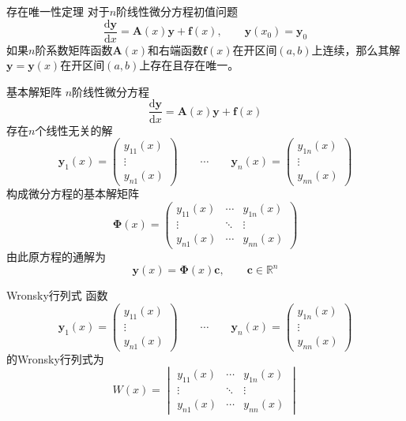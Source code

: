 \documentclass[lang = cn, scheme = chinese, thmcnt = section]{elegantbook}
\newcommand{\R}{\mathbb{R}}            %
\newcommand{\bs}{\boldsymbol}          %
\begin{document}
\begin{theorem}{存在唯一性定理}
	对于$n$阶线性微分方程初值问题
	$$
	\frac{\mathrm{d}\bs{y}}{\mathrm{d}x}=\bs{A}(x)\bs{y}+\bs{f}(x),\qquad 
	\bs{y}(x_0)=\bs{y}_0
	$$
	如果$n$阶系数矩阵函数$\bs{A}(x)$和右端函数$\bs{f}(x)$在开区间$(a,b)$上连续，那么其解$\bs{y}=\bs{y}(x)$在开区间$(a,b)$上存在且存在唯一。
\end{theorem}

\begin{definition}{基本解矩阵}
	$n$阶线性微分方程
	$$
	\frac{\mathrm{d}\bs{y}}{\mathrm{d}x}=\bs{A}(x)\bs{y}+\bs{f}(x)
	$$
	存在$n$个线性无关的解%
	$$
	\bs{y}_1(x)=\left(\begin{matrix}y_{11}(x)\\\vdots\\y_{n1}(x)\end{matrix}\right)\qquad 
	\cdots\qquad 
	\bs{y}_n(x)=\left(\begin{matrix}y_{1n}(x)\\\vdots\\y_{nn}(x)\end{matrix}\right)
	$$
	构成微分方程的基本解矩阵
	$$
	\bs{\Phi}(x)=\begin{pmatrix}
		y_{11}(x)&\cdots&y_{1n}(x)\\
		\vdots&\ddots&\vdots\\
		y_{n1}(x)&\cdots&y_{nn}(x)
	\end{pmatrix}
	$$
	由此原方程的通解为
	$$
	\bs{y}(x)=\bs{\Phi}(x)\bs{c},\qquad \bs{c}\in\R^n
	$$
\end{definition}

\begin{definition}{Wronsky行列式}
	函数
	$$
	\bs{y}_1(x)=\left(\begin{matrix}y_{11}(x)\\\vdots\\y_{n1}(x)\end{matrix}\right)\qquad 
	\cdots\qquad 
	\bs{y}_n(x)=\left(\begin{matrix}y_{1n}(x)\\\vdots\\y_{nn}(x)\end{matrix}\right)
	$$
	的Wronsky行列式为%
	$$
	W(x)=\begin{vmatrix}
		y_{11}(x)&\cdots&y_{1n}(x)\\
		\vdots&\ddots&\vdots\\
		y_{n1}(x)&\cdots&y_{nn}(x)
	\end{vmatrix}
	$$
\end{definition}
\end{document}
